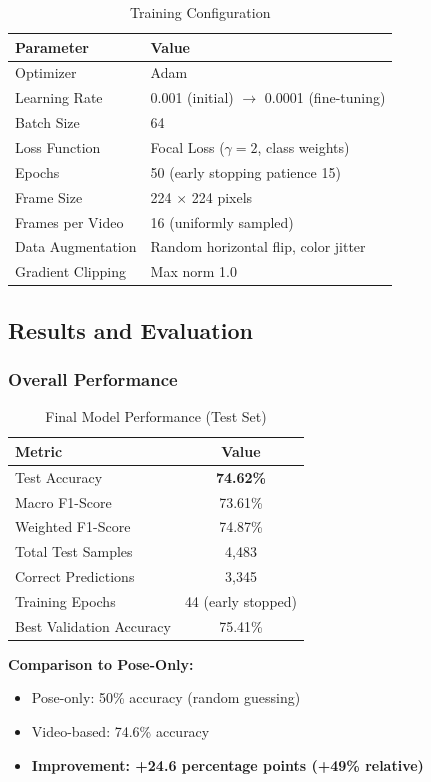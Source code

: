 \documentclass[12pt,a4paper]{article}
\begin{document}
\begin{table}[H]
\centering
\caption{Training Configuration}
\begin{tabular}{ll}
\toprule
Parameter & Value \\
\midrule
Optimizer & Adam \\
Learning Rate & 0.001 (initial) $\to$ 0.0001 (fine-tuning) \\
Batch Size & 64 \\
Loss Function & Focal Loss ($\gamma=2$, class weights) \\
Epochs & 50 (early stopping patience 15) \\
Frame Size & 224 $\times$ 224 pixels \\
Frames per Video & 16 (uniformly sampled) \\
Data Augmentation & Random horizontal flip, color jitter \\
Gradient Clipping & Max norm 1.0 \\
\bottomrule
\end{tabular}
\end{table}

\subsection{Results and Evaluation}

\subsubsection{Overall Performance}

\begin{table}[H]
\centering
\caption{Final Model Performance (Test Set)}
\begin{tabular}{lc}
\toprule
Metric & Value \\
\midrule
Test Accuracy & \textbf{74.62\%} \\
Macro F1-Score & 73.61\% \\
Weighted F1-Score & 74.87\% \\
Total Test Samples & 4,483 \\
Correct Predictions & 3,345 \\
Training Epochs & 44 (early stopped) \\
Best Validation Accuracy & 75.41\% \\
\bottomrule
\end{tabular}
\end{table}

\textbf{Comparison to Pose-Only:}
\begin{itemize}
\item Pose-only: 50\% accuracy (random guessing)
\item Video-based: 74.6\% accuracy
\item \textbf{Improvement: +24.6 percentage points (+49\% relative)}
\end{itemize}
\end{document}
